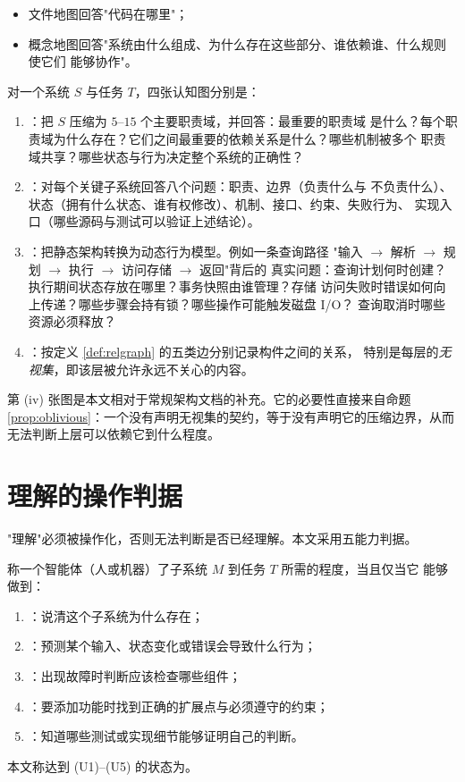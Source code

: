 \begin{itemize}
\item 文件地图回答"代码在哪里"；
\item 概念地图回答"系统由什么组成、为什么存在这些部分、谁依赖谁、什么规则使它们
      能够协作"。
\end{itemize}

\begin{definition}[四张认知图]\label{def:fourmaps}
对一个系统 $S$ 与任务 $T$，四张认知图分别是：
\begin{enumerate}[label=(\roman*)]
\item {}：把 $S$ 压缩为 $5$--$15$ 个主要职责域，并回答：最重要的职责域
      是什么？每个职责域为什么存在？它们之间最重要的依赖关系是什么？哪些机制被多个
      职责域共享？哪些状态与行为决定整个系统的正确性？
\item {}：对每个关键子系统回答八个问题：职责、边界（负责什么与
      不负责什么）、状态（拥有什么状态、谁有权修改）、机制、接口、约束、失败行为、
      实现入口（哪些源码与测试可以验证上述结论）。
\item {}：把静态架构转换为动态行为模型。例如一条查询路径
      "输入 $\to$ 解析 $\to$ 规划 $\to$ 执行 $\to$ 访问存储 $\to$ 返回"背后的
      真实问题：查询计划何时创建？执行期间状态存放在哪里？事务快照由谁管理？存储
      访问失败时错误如何向上传递？哪些步骤会持有锁？哪些操作可能触发磁盘 I/O？
      查询取消时哪些资源必须释放？
\item {}：按定义 \ref{def:relgraph} 的五类边分别记录构件之间的关系，
      特别是每层的\emph{无视集}，即该层被允许永远不关心的内容。
\end{enumerate}
\end{definition}

第 (iv) 张图是本文相对于常规架构文档的补充。它的必要性直接来自命题
\ref{prop:oblivious}：一个没有声明无视集的契约，等于没有声明它的压缩边界，从而
无法判断上层可以依赖它到什么程度。

\section{理解的操作判据}\label{sec:five-capabilities}

"理解"必须被操作化，否则无法判断是否已经理解。本文采用五能力判据。

\begin{definition}[理解判据]\label{def:understand}
称一个智能体（人或机器）了子系统 $M$ 到任务 $T$ 所需的程度，当且仅当它
能够做到：
\begin{enumerate}[label=(U\arabic*)]
\item {}：说清这个子系统为什么存在；
\item {}：预测某个输入、状态变化或错误会导致什么行为；
\item {}：出现故障时判断应该检查哪些组件；
\item {}：要添加功能时找到正确的扩展点与必须遵守的约束；
\item {}：知道哪些测试或实现细节能够证明自己的判断。
\end{enumerate}
本文称达到 (U1)--(U5) 的状态为。
\end{definition}

